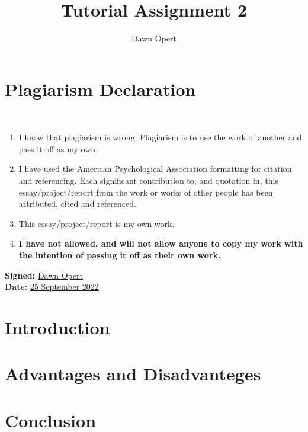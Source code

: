 \documentclass[stu,a4paper,12pt,donotrepeattitle]{apa7}
\title{Tutorial Assignment 2}
\author{Dawn Opert}
\affiliation{OPRNET001}
\begin{document}
\maketitle
\section{Plagiarism Declaration}
\\[1in]
\begin{enumerate}
    \item I know that plagiarism is wrong. Plagiarism is to use the work of
        another and pass it off as my own.
    \item I have used the American Psychological Association formatting for
        citation and referencing. Each significant contribution to, and
        quotation in, this essay/project/report from the work or works of other
        people has been attributed, cited and referenced.
    \item This essay/project/report is my own work.
    \item \textbf{I have not allowed, and will not allow anyone to copy my work
        with the intention of passing it off as their own work.}
\end{enumerate}

\textbf{Signed:} \underline{Dawn Opert}\\
\textbf{Date:} \underline{25 September 2022}
\newpage
\section{Introduction}
\section{Advantages and Disadvanteges}
\section{Conclusion}
\newpage
\printbibliography
\end{document}
